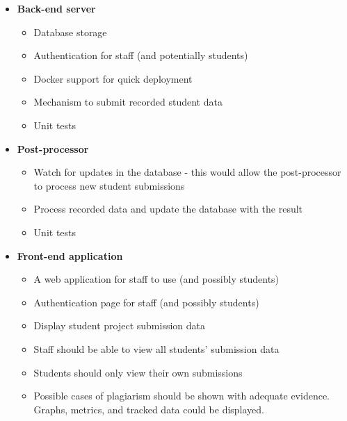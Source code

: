\begin{itemize}
\begin{itemize}
    \item \textbf{Back-end server}
    \begin{itemize}
      \item Database storage
      \item Authentication for staff (and potentially students)
      \item Docker support for quick deployment
      \item Mechanism to submit recorded student data
      \item Unit tests
    \end{itemize}

    \item \textbf{Post-processor}
    \begin{itemize}
      \item Watch for updates in the database - this would allow the post-processor to process new student submissions
      \item Process recorded data and update the database with the result
      \item Unit tests
    \end{itemize}

    \item \textbf{Front-end application}
    \begin{itemize}
      \item A web application for staff to use (and possibly students)
      \item Authentication page for staff (and possibly students)
      \item Display student project submission data
      \item Staff should be able to view all students' submission data
      \item Students should only view their own submissions
      \item Possible cases of plagiarism should be shown with adequate evidence. Graphs, metrics, and tracked data could be displayed.
    \end{itemize}
  \end{itemize}
\end{itemize}

